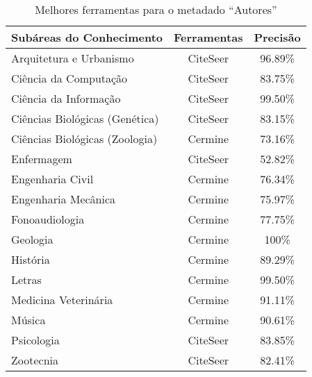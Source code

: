 \begin{table}
    \caption{Melhores ferramentas para o metadado ``Autores''}
    \begin{center}
        \begin{tabular}{|l|c|c|}
            \hline 
            \textbf{Subáreas do Conhecimento} & \textbf{Ferramentas} & \textbf{Precisão} \\ 
            \hline 
            Arquitetura e Urbanismo & CiteSeer & 96.89\% \\ \hline
            Ciência da Computação & CiteSeer & 83.75\% \\ \hline
            Ciência da Informação & CiteSeer & 99.50\% \\ \hline
            Ciências Biológicas (Genética) & CiteSeer & 83.15\% \\ \hline
            Ciências Biológicas (Zoologia) & Cermine & 73.16\% \\ \hline
            Enfermagem & CiteSeer & 52.82\% \\ \hline
            Engenharia Civil & Cermine & 76.34\% \\ \hline
            Engenharia Mecânica & Cermine & 75.97\% \\ \hline
            Fonoaudiologia & Cermine & 77.75\% \\ \hline
            Geologia & Cermine & 100\% \\ \hline
            História & Cermine & 89.29\% \\ \hline
            Letras & Cermine & 99.50\% \\ \hline
            Medicina Veterinária & Cermine & 91.11\% \\ \hline
            Música & Cermine & 90.61\% \\ \hline
            Psicologia & CiteSeer & 83.85\% \\ \hline
            Zootecnia & CiteSeer & 82.41\% \\ \hline
        \end{tabular}
    \end{center}
    \label{tab:areas-authors-tools}
\end{table}

